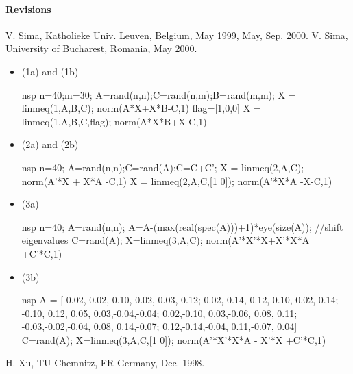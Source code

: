 \paragraph{Revisions}
V. Sima, Katholieke Univ. Leuven, Belgium, May 1999, May, Sep. 2000. V. Sima, University of Bucharest, Romania, May 2000.
\begin{examples}
\begin{itemize}
  \item (1a) and (1b)
    \begin{mintednsp}{nsp}
      n=40;m=30;
      A=rand(n,n);C=rand(n,m);B=rand(m,m);
      X = linmeq(1,A,B,C);
      norm(A*X+X*B-C,1)
      flag=[1,0,0]
      X = linmeq(1,A,B,C,flag);
      norm(A*X*B+X-C,1)
    \end{mintednsp}
  \item (2a) and (2b)
    \begin{mintednsp}{nsp}
      n=40;
      A=rand(n,n);C=rand(A);C=C+C';
      X = linmeq(2,A,C);
      norm(A'*X + X*A -C,1)
      X = linmeq(2,A,C,[1 0]);
      norm(A'*X*A -X-C,1)
    \end{mintednsp}
  \item (3a)
    \begin{mintednsp}{nsp}
      n=40;
      A=rand(n,n);
      A=A-(max(real(spec(A)))+1)*eye(size(A)); //shift eigenvalues
      C=rand(A);
      X=linmeq(3,A,C);
      norm(A'*X'*X+X'*X*A +C'*C,1)
    \end{mintednsp}
  \item (3b)
    \begin{mintednsp}{nsp}
      A = [-0.02, 0.02,-0.10, 0.02,-0.03, 0.12;
      0.02, 0.14, 0.12,-0.10,-0.02,-0.14;     
      -0.10, 0.12, 0.05, 0.03,-0.04,-0.04;     
      0.02,-0.10, 0.03,-0.06, 0.08, 0.11;      
      -0.03,-0.02,-0.04, 0.08, 0.14,-0.07;   
      0.12,-0.14,-0.04, 0.11,-0.07, 0.04]    
      C=rand(A);
      X=linmeq(3,A,C,[1 0]);
      norm(A'*X'*X*A - X'*X +C'*C,1)
    \end{mintednsp}
  \end{itemize}
\end{examples}
\begin{manseealso}
     
\end{manseealso}
\begin{authors}
  H. Xu, TU Chemnitz, FR Germany, Dec. 1998.  
\end{authors}
